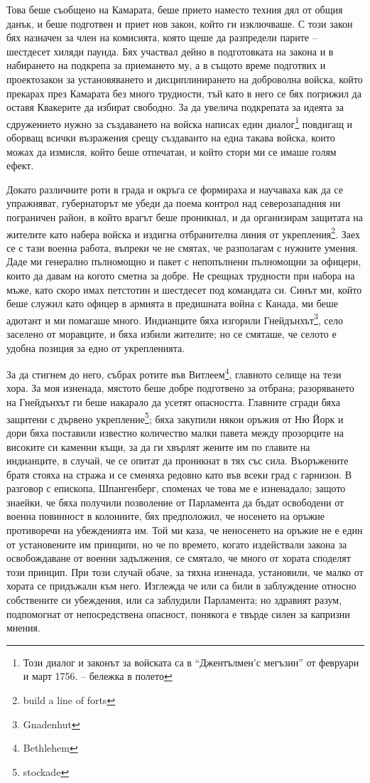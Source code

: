 \documentclass[12pt]{book}
\begin{document}
Това беше съобщено на Камарата, беше прието наместо техния дял от общия данък, и беше подготвен и приет нов закон, който ги изключваше. С този закон бях назначен за член на комисията, която щеше да разпредели парите – шестдесет хиляди паунда. Бях участвал дейно в подготовката на закона и в набирането на подкрепа за приемането му, а в същото време подготвих и проектозакон за установяването и дисциплинирането на доброволна войска, който прекарах през Камарата без много трудности, тъй като в него се бях погрижил да оставя Квакерите да избират свободно. За да увелича подкрепата за идеята за сдружението нужно за създаването на войска написах един диалог\footnote{Този диалог и законът за войската са в “Джентълмен'с мегъзин” от февруари и март 1756. – бележка в полето} повдигащ и оборващ всички възражения срещу създаванто на една такава войска, които можах да измисля, който беше отпечатан, и който стори ми се имаше голям ефект. 

Докато различните роти в града и окръга се формираха и научаваха как да се упражняват, губернаторът ме убеди да поема контрол над северозападния ни пограничен район, в който врагът беше проникнал, и да организирам защитата на жителите като набера войска и издигна отбранителна линия от укрепления\footnote{build a line of forts}. Заех се с тази военна работа, въпреки че не смятах, че разполагам с нужните умения. Даде ми генерално пълномощно и пакет с непопълнени пълномощни за офицери, които да давам на когото сметна за добре. Не срещнах трудности при набора на мъже, като скоро имах петстотин и шестдесет под командата си. Синът ми, който беше служил като офицер в армията в предишната война с Канада, ми беше адютант и ми помагаше много. Индианците бяха изгорили Гнейдънхът\footnote{Gnadenhut}, село заселено от моравците, и бяха избили жителите; но се смяташе, че селото е удобна позиция за едно от укрепленията. 

За да стигнем до него, събрах ротите във Витлеем\footnote{Bethlehem}, главното селище на тези хора. За моя изненада, мястото беше добре подготвено за отбрана; разоряването на Гнейдънхът ги беше накарало да усетят опасността. Главните сгради бяха защитени с дървено укрепление\footnote{stockade}; бяха закупили някои оръжия от Ню Йорк и дори бяха поставили известно количество малки павета между прозорците на високите си каменни къщи, за да ги хвърлят жените им по главите на индианците, в случай, че се опитат да проникнат в тях със сила. Въоръжените братя стояха на стража и се сменяха редовно като във всеки град с гарнизон. В разговор с епископа, Шпангенберг, споменах че това ме е изненадало; защото знаейки, че бяха получили позволение от Парламента да бъдат освободени от военна повинност в колониите, бях предположил, че носенето на оръжие противоречи на убежденията им. Той ми каза, че неносенето на оръжие не е един от установените им принципи, но че по времето, когато издействали закона за освобождаване от военни задължения, се смятало, че много от хората споделят този принцип. При този случай обаче, за тяхна изненада, установили, че малко от хората се придъжали към него. Изглежда че или са били в заблуждение относно собствените си убеждения, или са заблудили Парламента; но здравият разум, подпомогнат от непосредствена опасност, понякога е твърде силен за капризни мнения.
\end{document}
